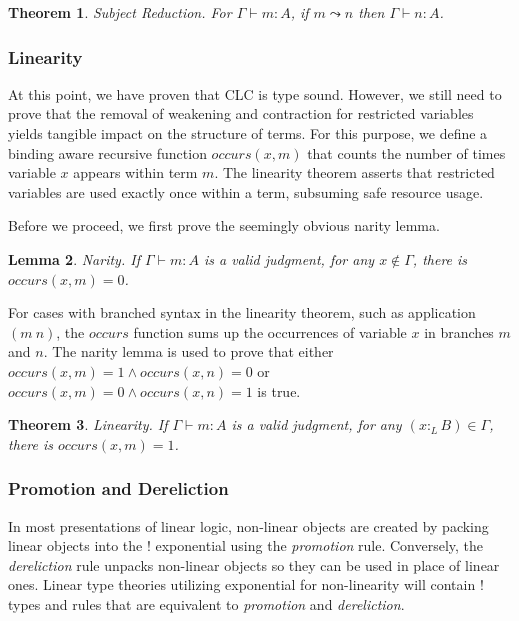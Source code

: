 \documentclass[sigplan,screen]{acmart}
\newtheorem{theorem}{Theorem}[section]
\newtheorem{lemma}[theorem]{Lemma}
\theoremstyle{definition}
\newcommand{\ltype}{:_{\scriptscriptstyle L}}
\newcommand{\pstep}{\leadsto}
\begin{document}
  \begin{theorem} 
    Subject Reduction. For $\Gamma \vdash m : A$, if $m \pstep n$ then $\Gamma \vdash n : A$.
  \end{theorem}

  \subsubsection{Linearity}
  At this point, we have proven that CLC is type sound. However, we still need to prove that the removal of weakening and contraction for restricted variables yields tangible impact on the structure of terms. For this purpose, we define a binding aware recursive function $occurs(x, m)$ that counts the number of times variable $x$ appears within term $m$. The linearity theorem asserts that restricted variables are used exactly once within a term, subsuming safe resource usage.

  Before we proceed, we first prove the seemingly obvious narity lemma. 

  \begin{lemma} 
    Narity. If $\Gamma \vdash m : A$ is a valid judgment, for any $x \notin \Gamma$, there is $occurs(x, m) = 0$.
  \end{lemma}

  For cases with branched syntax in the linearity theorem, such as application $(m\ n)$, the $occurs$ function sums up the occurrences of variable $x$ in branches $m$ and $n$. The narity lemma is used to prove that either $occurs(x, m) = 1 \wedge occurs(x, n) = 0$ or $occurs(x, m) = 0 \wedge occurs(x, n) = 1$ is true.

  \begin{theorem} 
    Linearity. If $\Gamma \vdash m : A$ is a valid judgment, for any $(x \ltype B) \in \Gamma$, there is $occurs(x, m) = 1$.
  \end{theorem}

  \subsubsection{Promotion and Dereliction}
  In most presentations of linear logic, non-linear objects are created by packing linear objects into the ! exponential using the \textit{promotion} rule. Conversely, the \textit{dereliction} rule unpacks non-linear objects so they can be used in place of linear ones. Linear type theories \cite{abramsky1993,dill,vakar14} utilizing exponential for non-linearity will contain ! types and rules that are equivalent to \textit{promotion} and \textit{dereliction}.
\end{document}
